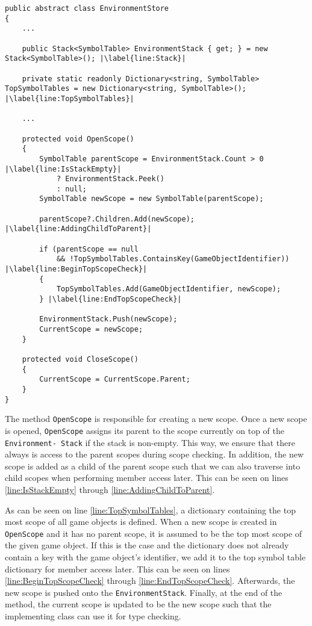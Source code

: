 \begin{lstlisting}[language=CSharp, caption={The abstract class \abstractsemanticclass{}.}, label={lst:ACSemanticAnalysis},escapechar=|]
public abstract class EnvironmentStore
{
    ...

    public Stack<SymbolTable> EnvironmentStack { get; } = new Stack<SymbolTable>(); |\label{line:Stack}|

    private static readonly Dictionary<string, SymbolTable> TopSymbolTables = new Dictionary<string, SymbolTable>(); |\label{line:TopSymbolTables}|

    ...

    protected void OpenScope()
    {
        SymbolTable parentScope = EnvironmentStack.Count > 0 |\label{line:IsStackEmpty}|
            ? EnvironmentStack.Peek() 
            : null;
        SymbolTable newScope = new SymbolTable(parentScope); 
        
        parentScope?.Children.Add(newScope); |\label{line:AddingChildToParent}|
        
        if (parentScope == null 
            && !TopSymbolTables.ContainsKey(GameObjectIdentifier)) |\label{line:BeginTopScopeCheck}|
        {
            TopSymbolTables.Add(GameObjectIdentifier, newScope);
        } |\label{line:EndTopScopeCheck}|

        EnvironmentStack.Push(newScope);
        CurrentScope = newScope;
    }

    protected void CloseScope()
    {
        CurrentScope = CurrentScope.Parent;
    }
}
\end{lstlisting}

The method \texttt{OpenScope} is responsible for creating a new scope. Once a new scope is opened, \texttt{OpenScope} assigns its parent to the scope currently on top of the \texttt{Environment-
Stack} if the stack is non-empty. This way, we ensure that there always is access to the parent scopes during scope checking. 
In addition, the new scope is added as a child of the parent scope such that we can also traverse into child scopes when performing member access later. This can be seen on lines \ref{line:IsStackEmpty} through \ref{line:AddingChildToParent}.


As can be seen on line \ref{line:TopSymbolTables}, a dictionary containing the top most scope of all game objects is defined. When a new scope is created in \texttt{OpenScope} and it has no parent scope, it is assumed to be the top most scope of the given game object.
If this is the case and the dictionary does not already contain a key with the game object's identifier, we add it to the top symbol table dictionary for member access later. This can be seen on lines \ref{line:BeginTopScopeCheck} through \ref{line:EndTopScopeCheck}.
Afterwards, the new scope is pushed onto the \texttt{EnvironmentStack}. 
Finally, at the end of the method, the current scope is updated to be the new scope such that the implementing class can use it for type checking. 

